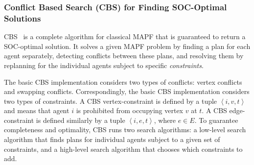 \documentclass[review]{elsarticle}
\newcommand{\tuple}[1]{\ensuremath{\left \langle #1 \right \rangle }}
\newcommand\roni[1]{\nb{\textbf{Roni:}}{green}{#1}}
\newcommand\dor[1]{\nb{\textbf{Dor:}}{Fuchsia}{#1}}
\newcommand{\cbs}{\ac{CBS}\xspace}
\newcommand{\mapf}{\ac{MAPF}\xspace}
\begin{document}
\subsubsection{Conflict Based Search (CBS) for 
Finding SOC-Optimal Solutions}
\label{sec:cbs}

\cbs~\cite{sharon2015conflict} is a complete algorithm for classical \mapf that is guaranteed to return a SOC-optimal solution. 
It solves a given \mapf problem by finding a plan for each agent separately, detecting conflicts between these plans, and resolving them by replanning for the individual agents subject to specific \emph{constraints}. 

The basic \cbs implementation considers two types of conflicts: vertex conflicts and swapping conflicts. 
Correspondingly, the basic \cbs implementation considers two types of constraints. 
A \cbs vertex-constraint is defined by a tuple $\tuple{i,v,t}$ and means that agent $i$ is prohibited from occupying vertex $v$ at $t$.  
A \cbs edge-constraint is defined similarly by a tuple $\tuple{i,e,t}$, where $e\in E$. To guarantee completeness and optimality, \cbs runs two search algorithms: a low-level search algorithm that finds plans for individual agents subject to a given set of constraints, and a high-level search algorithm that chooses which constraints to add. 



\end{document}
